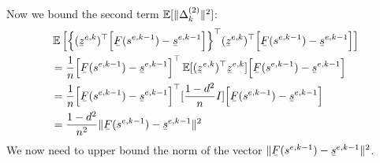 \documentclass[11pt]{article}
\theoremstyle{plain}
\begin{document}
Now we bound the second term $\operatorname*{\mathbb{E}}[\lVert\Delta_k^{(2)}\rVert^2] $:
\begin{equation}
\begin{split}
& \E \Big[\Big\{ (\barbelow{z}^{e,k})^\top \Big[ \barbelow{F}(s^{e,k-1}) - \barbelow{s}^{e,k-1} \Big] \Big\}^\top (\barbelow{z}^{e,k})^\top \Big[ \barbelow{F}(s^{e,k-1}) - \barbelow{s}^{e,k-1} \Big] \Big] \\
& = \frac{1}{n} \Big[ \barbelow{F}(s^{e,k-1}) - \barbelow{s}^{e,k-1} \Big]^\top \E[(\barbelow{z}^{e,k})^\top \barbelow{z}^{e,k}]  \Big[ \barbelow{F}(s^{e,k-1}) - \barbelow{s}^{e,k-1} \Big] \\
& = \frac{1}{n} \Big[ \barbelow{F}(s^{e,k-1}) - \barbelow{s}^{e,k-1} \Big]^\top [\frac{1 - d^2}{n} I]  \Big[ \barbelow{F}(s^{e,k-1}) - \barbelow{s}^{e,k-1} \Big] \\
& =  \frac{1-d^2}{n^2} \norm{ \barbelow{F}(s^{e,k-1}) - \barbelow{s}^{e,k-1}}^2
\end{split}
\end{equation}
We now need to upper bound the norm of the vector $\norm{ \barbelow{F}(s^{e,k-1}) - \barbelow{s}^{e,k-1}}^2$.
\end{document}

